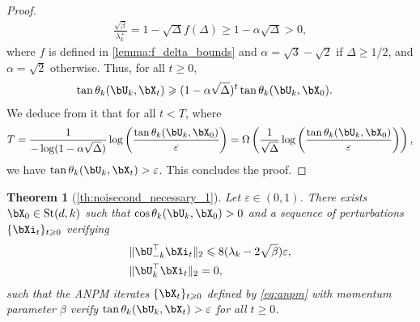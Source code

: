 \documentclass{article}
\theoremstyle{plain}
\newtheorem{theorem}{Theorem}[section]
\theoremstyle{definition}
\theoremstyle{remark}
\begin{document}
\begin{proof}
\begin{align*}
  \frac{\sqrt{\beta}}{\lambda_k^+} = 1 - \sqrt{\Delta} f(\Delta) \geqslant 1 - \alpha\sqrt{\Delta} > 0,
\end{align*}
where $f$ is defined in \cref{lemma:f_delta_bounds} and $\alpha = \sqrt{3} - \sqrt{2}$ if $\Delta \geqslant 1/2$, and $\alpha = \sqrt{2}$ otherwise. Thus, for all $t\geqslant 0$,
\begin{align*}
  \tan\theta_k(\bU_k,\bX_t) & \geqslant (1 - \alpha\sqrt{\Delta})^t \tan \theta_k(\bU_k, \bX_0).
\end{align*}
We deduce from it that for all $t < T$, where
\begin{align*}
  T = \frac{1}{-\log(1 - \alpha\sqrt{\Delta})} \log\left(\frac{\tan\theta_k(\bU_k, \bX_0)}{\varepsilon}\right) = \Omega\left(\frac{1}{\sqrt{\Delta}} \log\left(\frac{\tan\theta_k(\bU_k, \bX_0)}{\varepsilon}\right)\right),
\end{align*}
we have $\tan\theta_k(\bU_k, \bX_t) > \varepsilon$. This concludes the proof.
\end{proof}

\begin{theorem}[\cref{th:noisecond_necessary_1}]
  Let $\varepsilon \in (0,1)$. There exists $\bX_0 \in \mathrm{St}(d,k)$ such that $\cos\theta_k(\bU_k, \bX_0) > 0$ and a sequence of perturbations $\{\bXi_t\}_{t\geqslant 0}$ verifying
  \begin{align*}
    & \Vert \bU_{-k}^\top\bXi_t \Vert_2 \leqslant 8 (\lambda_k - 2\sqrt{\beta})\varepsilon,\\
    & \Vert \bU_k^\top \bXi_t \Vert_2 = 0,
  \end{align*}
  such that the ANPM iterates $\{\bX_t\}_{t\geqslant 0}$ defined by \eqref{eq:anpm} with momentum parameter $\beta$ verify $\tan\theta_k(\bU_k, \bX_t) > \varepsilon$ for all $t\geqslant 0$. 
\end{theorem}
\end{document}
